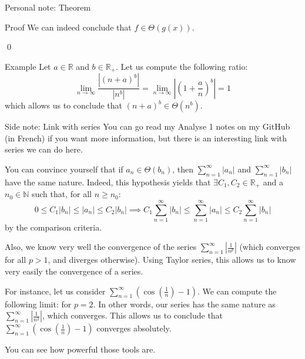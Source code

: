 \documentclass[a4paper]{article}
\begin{document}
\begin{parag}{Personal note: Theorem}
\begin{subparag}{Proof}
        We can indeed conclude that $f \in \Theta\left(g\left(x\right)\right)$.

        \qed
    \end{subparag}
    
    \begin{subparag}{Example}
        Let $a \in \mathbb{R}$ and $b \in \mathbb{R}_+$. Let us compute the following ratio:
        \[\lim_{n \to \infty} \frac{\left|\left(n + a\right)^b\right|}{\left|n^b\right|} = \lim_{n \to \infty} \left|\left(1 + \frac{a}{n}\right)^{b}\right| = 1\]
        which allows us to conclude that $\left(n + a\right)^b \in \Theta\left(n^b\right)$.
    \end{subparag}
    

    \begin{subparag}{Side note: Link with series}
        You can go read my Analyse 1 notes on my GitHub (in French) if you want more information, but there is an interesting link with series we can do here.

        You can convince yourself that if $a_n \in \Theta\left(b_n\right)$, then $\sum_{n = 1}^{\infty} \left|a_n\right|$ and $\sum_{n = 1}^{\infty} \left|b_n\right|$ have the same nature. Indeed, this hypothesis yields that $\exists C_1, C_2 \in \mathbb{R}_+$ and a $n_0 \in \mathbb{N}$ such that, for all $n \geq n_0$:
        \[0 \leq C_1 \left|b_n\right| \leq \left|a_n\right| \leq C_2 \left|b_n\right| \implies C_1 \sum_{n = 1}^{\infty} \left|b_n\right| \leq \sum_{n = 1}^{\infty}  \left|a_n\right| \leq C_2 \sum_{n = 1}^{\infty}  \left|b_n\right|\]
        by the comparison criteria. 

        Also, we know very well the convergence of the series $\sum_{n = 1}^{\infty} \left|\frac{1}{n^p}\right|$ (which converges for all $p > 1$, and diverges otherwise). Using Taylor series, this allows us to know very easily the convergence of a series.

        For instance, let us consider $\sum_{n = 1}^{\infty} \left(\cos\left(\frac{1}{n}\right) - 1\right)$. We can compute the following limit:
        for $p = 2$. In other words, our series has the same nature as $\sum_{n=1}^{\infty} \left|\frac{1}{n^2}\right|$, which converges. This allows us to conclude that $\sum_{n = 1}^{\infty} \left(\cos\left(\frac{1}{n}\right) - 1\right)$ converges absolutely. 

        You can see how powerful those tools are.
    \end{subparag}
    
\end{parag}
\end{document}
